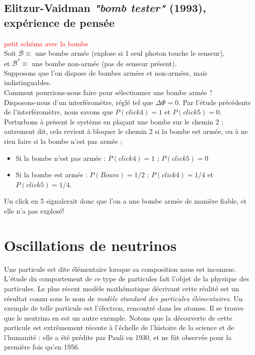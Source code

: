 \documentclass[../notesdecours.tex]{subfiles}
\begin{document}
\subsection{Elitzur-Vaidman \textit{"bomb tester"} (1993), expérience de pensée}

\textcolor{red}{petit schéma avec la bombe}\\
Soit $\mathcal{B} \equiv$ une bombe armée (explose si 1 seul photon touche le senseur), \\
et ${\mathcal{B^*}} \equiv$ une bombe non-armée (pas de senseur présent). \\

Supposons que l'on dispose de bombes armées et non-armées, mais indistinguables.\\
Comment pourrions-nous faire pour sélectionner une bombe armée ? \\

Disposons-nous d'un interféromètre, réglé tel que $\Delta \Phi = 0$. Par l'étude précédente de l'interféromètre, nous savons que $P(click 4) = 1$ et $P(click 5) = 0$. \\
Perturbons à présent le système en plaçant une bombe sur le chemin 2 ; autrement dit, cela revient à bloquer le chemin 2 si la bombe est armée, ou à ne rien faire si la bombe n'est pas armée ; 
\begin{itemize}
    \item Si la bombe n'est pas armée : $P(click 4) = 1$ ; $P(click 5) = 0$
    \item Si la bombe est armée : $P(Boum) = 1/2$ ; $P(click 4) = 1/4$ et $P(click 5) = 1/4$. 
\end{itemize}
Un click en 5 signalerait donc que l'on a une bombe armée de manière fiable, et elle n'a pas explosé! 

\section{Oscillations de neutrinos}
Une particule est dite élémentaire lorsque sa composition nous est inconnue. L'étude du comportement de ce type de particules fait l'objet de la physique des particules. Le plus récent modèle mathématique décrivant cette réalité est un résultat connu sous le nom de \textit{modèle standard des particules élémentaires}. Un exemple de telle particule est l'électron, rencontré dans les atomes. Il se trouve que le neutrino en est un autre exemple. Notons que la découverte de cette particule est extrêmement récente à l'échelle de l'histoire de la science et de l'humanité : elle a été prédite par Pauli en 1930, et ne fût observée pour la première fois qu'en 1956.\\
\end{document}
